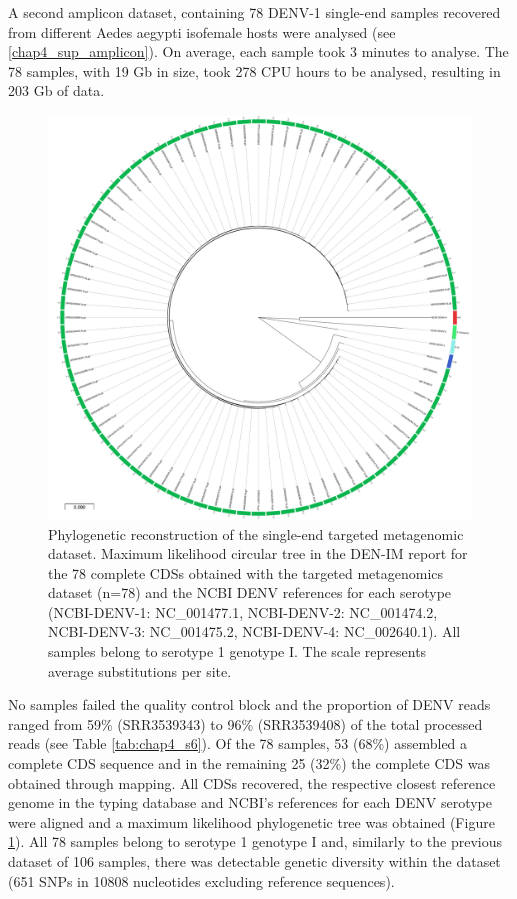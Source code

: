 A second amplicon dataset, containing 78 DENV-1 single-end samples recovered from different Aedes aegypti isofemale hosts were analysed (see \ref{chap4_sup_amplicon}). On average, each sample took 3 minutes to analyse. The 78 samples, with 19 Gb in size, took 278 CPU hours to be analysed, resulting in 203 Gb of data.

\begin{figure}[h!]
\centering
\includegraphics[width=\textwidth]{figures/chapter 4/Figure4.pdf}
\caption{Phylogenetic reconstruction of the single-end targeted metagenomic dataset. Maximum likelihood circular tree in the DEN-IM report for the 78 complete CDSs obtained with the targeted metagenomics dataset (n=78) and the NCBI DENV references for each serotype (NCBI-DENV-1: NC\_001477.1, NCBI-DENV-2: NC\_001474.2, NCBI-DENV-3: NC\_001475.2, NCBI-DENV-4: NC\_002640.1). All samples belong to serotype 1 genotype I. The scale represents average substitutions per site.}
\label{fig:chap4_figure4}
\end{figure}

No samples failed the quality control block and the proportion of DENV reads ranged from 59\% (SRR3539343) to 96\% (SRR3539408) of the total processed reads (see Table \ref{tab:chap4_s6}). Of the 78 samples, 53 (68\%) assembled a complete CDS sequence and in the remaining 25 (32\%) the complete CDS was obtained through mapping. All CDSs recovered, the respective closest reference genome in the typing database and NCBI’s references for each DENV serotype were aligned and a maximum likelihood phylogenetic tree was obtained (Figure \ref{fig:chap4_figure4}). All 78 samples belong to serotype 1 genotype I and, similarly to the previous dataset of 106 samples, there was detectable genetic diversity within the dataset (651 SNPs in 10808 nucleotides excluding reference sequences).


